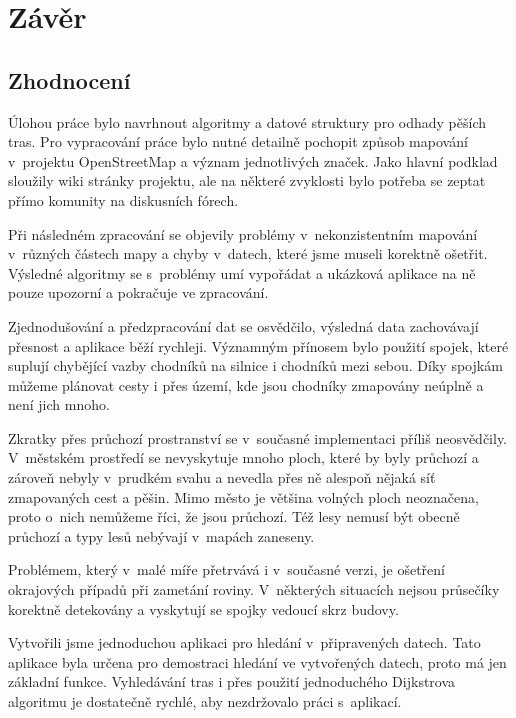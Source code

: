 \chapter*{Závěr}

\section*{Zhodnocení}
Úlohou práce bylo navrhnout algoritmy a datové struktury pro odhady pěších tras.
Pro vypracování práce bylo nutné detailně pochopit způsob mapování v~projektu
OpenStreetMap a význam jednotlivých značek. Jako hlavní podklad sloužily wiki
stránky projektu, ale na některé zvyklosti bylo potřeba se zeptat přímo komunity na
diskusních fórech. 

Při následném zpracování se objevily problémy v~nekonzistentním mapování
v~různých částech mapy a chyby v~datech, které jsme museli korektně ošetřit.
Výsledné algoritmy se s~problémy umí vypořádat a ukázková aplikace na ně pouze
upozorní a pokračuje ve zpracování. 

Zjednodušování a předzpracování dat se osvědčilo, výsledná data zachovávají
přesnost a aplikace běží rychleji. Významným přínosem bylo použití spojek, které
suplují chybějící vazby chodníků na silnice i chodníků mezi sebou. Díky spojkám
můžeme plánovat cesty i přes území, kde jsou chodníky zmapovány neúplně a není
jich mnoho. 

Zkratky přes průchozí prostranství se v~současné implementaci příliš neosvědčily.
V~městském prostředí se nevyskytuje mnoho ploch, které by byly průchozí a
zároveň nebyly v~prudkém svahu a nevedla přes ně alespoň nějaká síť
zmapovaných cest a pěšin. Mimo město je většina volných ploch neoznačena, proto
o~nich nemůžeme říci, že jsou průchozí. Též lesy nemusí být obecně průchozí a typy lesů
nebývají v~mapách zaneseny. 

Problémem, který v~malé míře přetrvává i v~současné verzi, je ošetření
okrajových případů při zametání roviny. V~některých situacích nejsou
průsečíky korektně detekovány a vyskytují se spojky vedoucí skrz budovy.  

Vytvořili jsme jednoduchou aplikaci pro hledání v~připravených datech. Tato
aplikace byla určena pro demostraci hledání ve vytvořených datech, proto má jen
základní funkce. Vyhledávání tras i přes použití jednoduchého Dijkstrova
algoritmu je dostatečně rychlé, aby nezdržovalo práci s~aplikací. 

